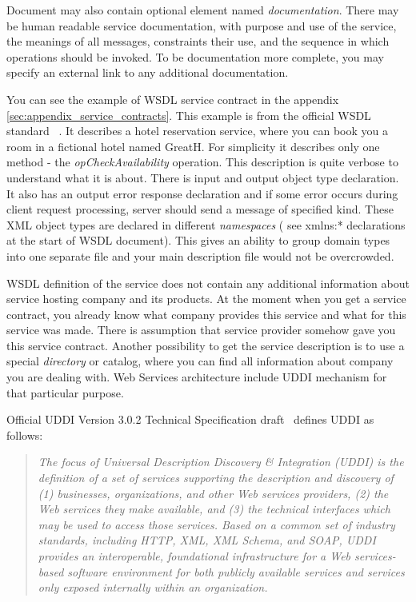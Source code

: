 

Document may also contain optional element named \textit{documentation}.
There may be human readable service documentation, with   purpose and use of the service, the meanings of all messages, constraints their use, and the sequence in which operations should be invoked.
To be documentation more complete, you may specify an external link to any additional documentation.


You can see the example of WSDL service contract in the appendix 
\autoref{sec:appendix_service_contracts}. This example is from the official
WSDL standard ~\cite{wsdl_language_spec}. It describes a hotel reservation
service, where you can book you a room in a fictional hotel named GreatH. For simplicity it describes
only one method - the \textit{opCheckAvailability} operation. This description
is quite verbose to understand what it is about. There is input and output
object type declaration. It also has an output error response declaration and
if some error occurs during client request processing, server should send a
message of specified kind.
These XML object types are declared in different \textit{namespaces} ( see
xmlns:*	declarations at the start of WSDL document). This gives an ability
to group domain types into one separate file and your main description
file would not be overcrowded.


WSDL definition of the service does not contain any additional
information about service hosting company and its products. At the moment when
you get a service contract, you already know what company provides this service and what
for this service was made. There is assumption that service provider somehow
gave you this service contract. Another possibility to get the service
description is to use a special \textit{directory} or catalog, where you can
find all information about company you are dealing with. Web Services
architecture include UDDI mechanism for that particular purpose.

Official UDDI Version 3.0.2 Technical Specification draft~\cite{uddi_spec}
defines UDDI as follows:
\begin{quotation}
\textit{
 The focus of Universal Description Discovery & Integration (UDDI) is the
definition of a set of services supporting the description and discovery of (1) businesses,
organizations, and other Web services providers, 
(2) the Web services they make available,
 and (3) the technical interfaces which may be used to access those services.
 Based on a common set of industry standards, including HTTP, XML, XML Schema, and SOAP,
 UDDI provides an interoperable, foundational infrastructure for a Web services-based software environment
 for both publicly available services and services only exposed internally within an organization.
}
\end{quotation}

